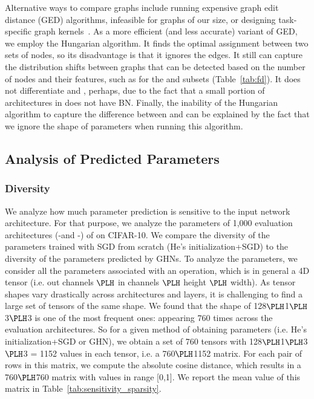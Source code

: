 Alternative ways to compare graphs include running expensive graph edit distance (GED) algorithms, infeasible for graphs of our size, or designing task-specific graph kernels~\cite{kriege2020survey,yanardag2015deep,jin2019auto,ma2021deep}. As a more efficient (and less accurate) variant of GED, we employ the Hungarian algorithm. It finds the optimal assignment between two sets of nodes, so its disadvantage is that it ignores the edges. It still can capture the distribution shifts between graphs that can be detected based on the number of nodes and their features, such as for the \deep and \dense subsets (Table~\ref{tab:fd}). It does not differentiate \iidtrain and \bnfree, perhaps, due to the fact that a small portion of architectures in \iidtrain does not have BN. Finally, the inability of the Hungarian algorithm to capture the difference between \iidtrain and \wide can be explained by the fact that we ignore the shape of parameters when running this algorithm.



\subsection{Analysis of Predicted Parameters}

\subsubsection{Diversity}

We analyze how much parameter prediction is sensitive to the input network architecture. For that purpose, we analyze the parameters of 1,000 evaluation architectures (\iid-\iidval and \iid-\iidtest) of \dataset on CIFAR-10. We compare the diversity of the parameters trained with SGD from scratch (He’s initialization+SGD) to the diversity of the parameters predicted by GHNs. To analyze the parameters, we consider all the parameters associated with an operation, which is in general a 4D tensor (i.e. out channels $\PLH$ in channels $\PLH$ height $\PLH$ width). As tensor shapes vary drastically across architectures and layers, it is challenging to find a large set of tensors of the same shape. We found that the shape of 128$\PLH$1$\PLH$3$\PLH$3 is one of the most frequent ones: appearing 760 times across the evaluation architectures. So for a given method of obtaining parameters (i.e. He’s initialization+SGD or GHN), we obtain a set of 760 tensors with 128$\PLH$1$\PLH$3$\PLH$3 = 1152 values in each tensor, i.e. a 760$\PLH$1152 matrix. For each pair of rows in this matrix, we compute the absolute cosine distance, which results in a 760$\PLH$760 matrix with values in range [0,1]. We report the mean value of this matrix in Table~\ref{tab:sensitivity_sparsity}.

